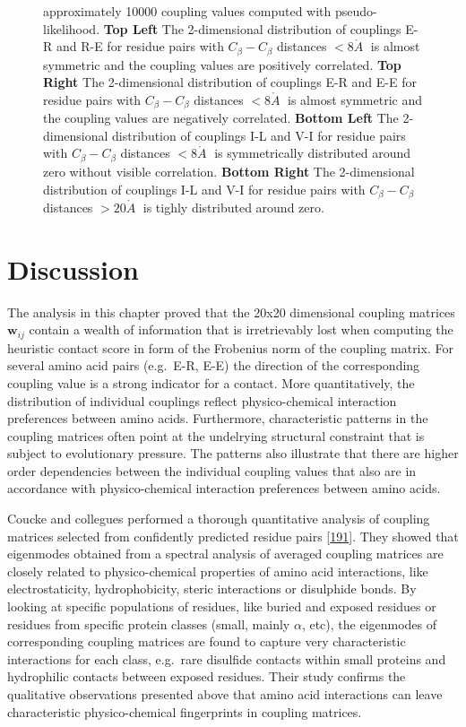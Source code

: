 \documentclass[11pt,a4paper,twoside]{book}
\newcommand{\Cb}{C_\beta}
\newcommand{\wij}{\mathbf{w}_{ij}}
\newcommand{\angstrom}{\mathring{A} \;}
\theoremstyle{definition}
\theoremstyle{definition}
\theoremstyle{remark}
\begin{document}
\begin{figure}
{approximately 10000 coupling values computed with pseudo-likelihood.
\textbf{Top Left} The 2-dimensional distribution of couplings E-R and
R-E for residue pairs with \(\Cb-\Cb\) distances \(< 8 \angstrom\) is
almost symmetric and the coupling values are positively correlated.
\textbf{Top Right} The 2-dimensional distribution of couplings E-R and
E-E for residue pairs with \(\Cb-\Cb\) distances \(< 8 \angstrom\) is
almost symmetric and the coupling values are negatively correlated.
\textbf{Bottom Left} The 2-dimensional distribution of couplings I-L and
V-I for residue pairs with \(\Cb-\Cb\) distances \(< 8 \angstrom\) is
symmetrically distributed around zero without visible correlation.
\textbf{Bottom Right} The 2-dimensional distribution of couplings I-L
and V-I for residue pairs with \(\Cb-\Cb\) distances \(> 20 \angstrom\)
is tighly distributed around zero.}\label{fig:2d-coupling-profiles-0-8}
\end{figure}

\section{Discussion}\label{discussion}

The analysis in this chapter proved that the 20x20 dimensional coupling
matrices \(\wij\) contain a wealth of information that is irretrievably
lost when computing the heuristic contact score in form of the Frobenius
norm of the coupling matrix. For several amino acid pairs (e.g.~E-R,
E-E) the direction of the corresponding coupling value is a strong
indicator for a contact. More quantitatively, the distribution of
individual couplings reflect physico-chemical interaction preferences
between amino acids. Furthermore, characteristic patterns in the
coupling matrices often point at the undelrying structural constraint
that is subject to evolutionary pressure. The patterns also illustrate
that there are higher order dependencies between the individual coupling
values that also are in accordance with physico-chemical interaction
preferences between amino acids.

Coucke and collegues performed a thorough quantitative analysis of
coupling matrices selected from confidently predicted residue pairs
{[}\protect\hyperlink{ref-Coucke2016}{191}{]}. They showed that
eigenmodes obtained from a spectral analysis of averaged coupling
matrices are closely related to physico-chemical properties of amino
acid interactions, like electrostaticity, hydrophobicity, steric
interactions or disulphide bonds. By looking at specific populations of
residues, like buried and exposed residues or residues from specific
protein classes (small, mainly \(\alpha\), etc), the eigenmodes of
corresponding coupling matrices are found to capture very characteristic
interactions for each class, e.g.~rare disulfide contacts within small
proteins and hydrophilic contacts between exposed residues. Their study
confirms the qualitative observations presented above that amino acid
interactions can leave characteristic physico-chemical fingerprints in
coupling matrices.
\end{document}

